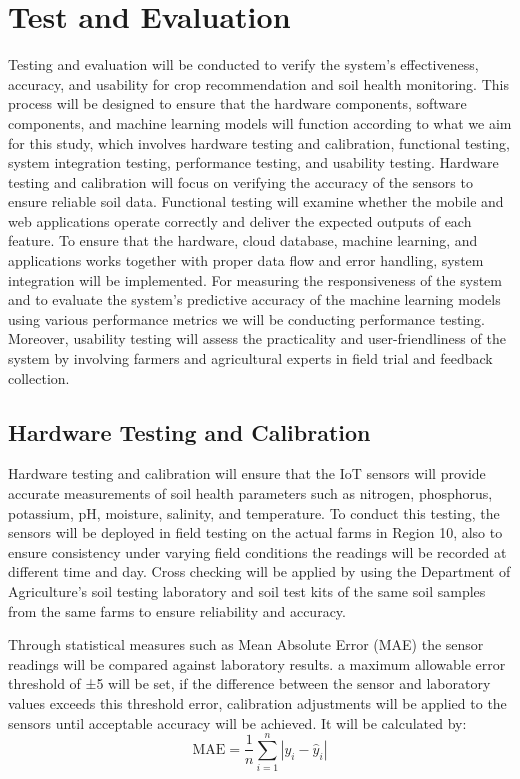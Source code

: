 {	\section{Test and Evaluation}
	Testing and evaluation will be conducted to verify the system’s effectiveness, accuracy, and usability for crop recommendation and soil health monitoring. This process will be designed to ensure that the hardware components, software components, and machine learning models will function according to what we aim for this study, which involves hardware testing and calibration, functional testing, system integration testing, performance testing, and usability testing. Hardware testing and calibration will focus on verifying the accuracy of the sensors to ensure reliable soil data. Functional testing will examine whether the mobile and web applications operate correctly and deliver the expected outputs of each feature. To ensure that the hardware, cloud database, machine learning, and applications works together with proper data flow and error handling, system integration will be implemented. For measuring the responsiveness of the system and to evaluate the system’s predictive accuracy of the machine learning models using various performance metrics we will be conducting performance testing. Moreover, usability testing will assess the practicality and user-friendliness of the system by involving farmers and agricultural experts in field trial and feedback collection.
	
	\subsection{Hardware Testing and Calibration}
	Hardware testing and calibration will ensure that the IoT sensors will provide accurate measurements of soil health parameters such as nitrogen, phosphorus, potassium, pH, moisture, salinity, and temperature. To conduct this testing, the sensors will be deployed in field testing on the actual farms in Region 10, also to ensure consistency under varying field conditions the readings will be recorded at different time and day. Cross checking will be applied by using the Department of Agriculture’s soil testing laboratory and soil test kits of the same soil samples from the same farms to ensure reliability and accuracy.
	
	Through statistical measures such as Mean Absolute Error (MAE) the sensor readings will be compared against laboratory results. a maximum allowable error threshold of ±5 will be set, if the difference between the sensor and laboratory values exceeds this threshold error, calibration adjustments will be applied to the sensors until acceptable accuracy will be achieved. It will be calculated by:
	\begin{equation}
		\text{MAE} = \frac{1}{n} \sum_{i=1}^{n} |y_i - \hat{y}_i|
		\label{eq:mae}
	\end{equation}
	
}

